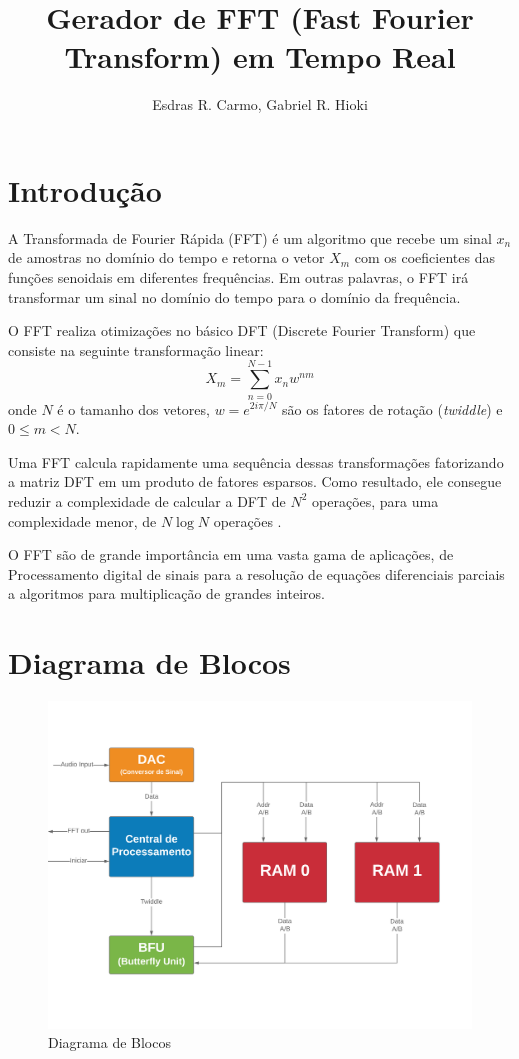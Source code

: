 \documentclass{article}
\newcommand{\tit}[1]{\textit{#1}}
\begin{document}
\title{Gerador de FFT (Fast Fourier Transform) em Tempo Real}
\author{Esdras R. Carmo, Gabriel R. Hioki}

\maketitle
\newpage
\tableofcontents
\newpage

\section{Introdução}

		A Transformada de Fourier Rápida (FFT) é um algoritmo que recebe um sinal
$x_n$ de amostras no domínio do tempo e retorna o vetor $X_m$ com os coeficientes
das funções senoidais em diferentes frequências. Em outras palavras, o FFT irá 
transformar um sinal no domínio do tempo para o domínio da frequência.

O FFT realiza otimizações no básico DFT (Discrete Fourier Transform) que consiste na seguinte
transformação linear:
$$
    X_m = \sum_{n=0}^{N-1}x_n w^{nm}
$$
onde $N$ é o tamanho dos vetores, $w = e^{2i\pi/N}$ são os fatores de rotação (\tit{twiddle}) e
$0 \leq m < N$. 

Uma FFT calcula rapidamente uma sequência dessas transformações fatorizando a matriz DFT em um produto de fatores esparsos. Como resultado, ele consegue reduzir a complexidade de calcular a DFT de  $N^2$ operações, para uma complexidade menor, de $N \log N$ operações \cite{fft-hardware}.

O FFT são de grande importância em uma vasta gama de aplicações, de Processamento digital de sinais para a resolução de equações diferenciais parciais a algoritmos para multiplicação de grandes inteiros.

\section{Diagrama de Blocos}

\begin{figure}[h!]
  \includegraphics[width=\linewidth]{img/img.png}
  \caption{Diagrama de Blocos}
  \label{fig:diag}
\end{figure}
\end{document}
